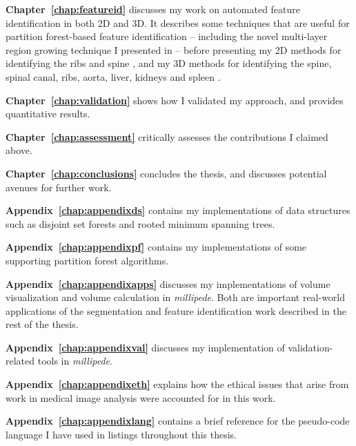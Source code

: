 \textbf{Chapter~\ref{chap:featureid}} discusses my work on automated feature identification in both 2D and 3D. It describes some techniques that are useful for partition forest-based feature identification -- including the novel multi-layer region growing technique I presented in \cite{gvcispa09} -- before presenting my 2D methods for identifying the ribs \cite{gvccimi08} and spine \cite{gvcispa09}, and my 3D methods for identifying the spine, spinal canal, ribs, aorta, liver, kidneys and spleen \cite{gvcoucl10}.

\textbf{Chapter~\ref{chap:validation}} shows how I validated my approach, and provides quantitative results.

\textbf{Chapter~\ref{chap:assessment}} critically assesses the contributions I claimed above.

\textbf{Chapter~\ref{chap:conclusions}} concludes the thesis, and discusses potential avenues for further work.

\textbf{Appendix~\ref{chap:appendixds}} contains my implementations of data structures such as disjoint set forests and rooted minimum spanning trees.

\textbf{Appendix~\ref{chap:appendixpf}} contains my implementations of some supporting partition forest algorithms.

\textbf{Appendix~\ref{chap:appendixapps}} discusses my implementations of volume visualization and volume calculation in \emph{millipede}. Both are important real-world applications of the segmentation and feature identification work described in the rest of the thesis.

\textbf{Appendix~\ref{chap:appendixval}} discusses my implementation of validation-related tools in \emph{millipede}.

\textbf{Appendix~\ref{chap:appendixeth}} explains how the ethical issues that arise from work in medical image analysis were accounted for in this work.

\textbf{Appendix~\ref{chap:appendixlang}} contains a brief reference for the pseudo-code language I have used in listings throughout this thesis.
